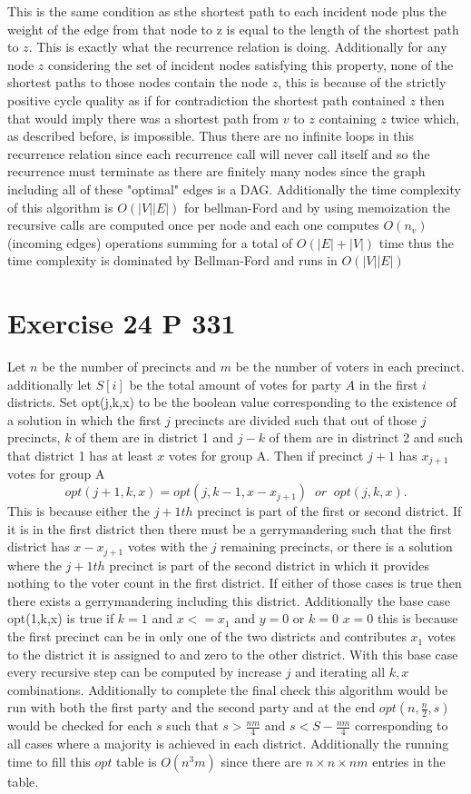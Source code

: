 \documentclass{amsart}
\begin{document}
This is the same condition as sthe shortest path to each incident node plus the weight of the edge from that node to z is equal to the length of the shortest path to $z$. This is exactly what the recurrence relation is doing.
Additionally for any node $z$ considering the set of incident nodes satisfying this property, none of the shortest paths to those nodes contain the node $z$, this is because of the strictly positive
cycle quality as if for contradiction the shortest path contained $z$ then that would imply there was a shortest path from $v$ to $z$ containing $z$ twice which, as described before, is impossible.
Thus there are no infinite loops in this recurrence relation since each recurrence call will never call itself and so the recurrence must terminate as there are finitely many nodes since the graph including all of these "optimal" edges is a DAG.
Additionally the time complexity of this algorithm is $O(|V||E|)$ for bellman-Ford and by using memoization the recursive calls are computed once per node and each one computes $O(n_v)$ (incoming edges) operations summing for a total of
 $O(|E| + |V|)$ time thus the time complexity is dominated by Bellman-Ford and runs in $O(|V||E|)$


\section{Exercise 24 P 331}
Let $n$ be the number of precincts and $m$ be the number of voters in each precinct. additionally let $S[i]$ be the total amount of votes for party  $A$ in the first $i$ districts.
Set opt(j,k,x) to be the boolean value corresponding to the existence of a solution
in which the first $j$ precincts are divided such that out of those $j$ precincts,
$k$ of them are in district 1 and $j-k$ of them are in distrinct 2 and such that
district 1 has at least $x$ votes for group A.
Then if precinct $j+1$ has $x_{j+1}$ votes for group A
\[
    opt(j+1,k,x) = opt(j,k-1,x-x_{j+1}) \;\; or \;\; opt(j,k,x)
.\] 
This is because either the $j+1th$ precinct is part of the first or second district. If it is in the first district then there must be a gerrymandering
such that the first district has $x-x_{j+1}$ votes with the $j$ remaining precincts, or there is a solution where the $j+1th$ precinct  is part
of the second district in which it provides nothing to the voter count in the first district.
If either of those cases is true then there exists a gerrymandering including this district.
Additionally the base case opt(1,k,x) is true if $k=1$ and $x <= x_{1}$ and $y = 0$ or $k=0$ $x = 0$  this is because
the first precinct can be in only one of the two districts and contributes  $x_1$ votes to the district it is assigned to and zero to the other district.
With this base case every recursive step can be computed by increase $j$ and iterating all $k,x$ combinations.
Additionally to complete the final check this algorithm would be run with both the first party and the second party and at the end $opt(n,\frac{n}{2},s)$ would be checked for each $s$ such that
$s > \frac{nm}{4}$ and $s < S - \frac{nm}{4}$ corresponding to all cases where a majority is achieved in each district. Additionally the running time to fill this $opt$ table is $O(n^{3}m)$ since there are $n\times n \times nm$ entries in the table.
\end{document}

